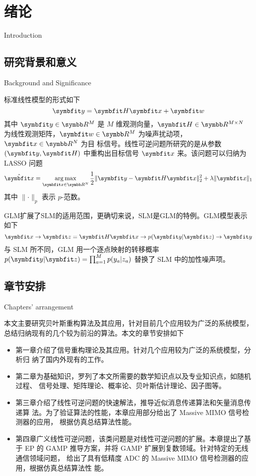 \documentclass[type=master]{../gdutthesis}
\newcommand{\mbb}{\symbb}
\newcommand{\mbfit}{\symbfit}
\DeclareMathOperator*{\argmax}{arg\,max}
\begin{document}
\gduttableofcontents

\mainmatter

\chapter{绪论}{Introduction}
\section{研究背景和意义}{Background and Significance}

标准线性模型的形式如下
\begin{equation}
  \mbfit y = \mbfit H \mbfit x + \mbfit w
\end{equation}
其中 $\mbfit y \in \mbb R^M$ 是 $M$ 维观测向量，$\mbfit H \in \mbb R^{M \times N}$
为线性观测矩阵，$\mbfit w \in \mbb R^M$ 为噪声扰动项，$\mbfit x \in \mbb R^N$ 为目
标信号。线性可逆问题所研究的是从参数 $(\mbfit y, \mbfit H)$ 中重构出目标信号 $\mbfit x$ 来。该问题可以归纳为 LASSO 问题
\begin{equation}
  \hat{ \mbfit x } = \argmax_{ \mbfit x \in \mbb R^N } \frac{1}{2} \lVert \mbfit y - \mbfit H \mbfit x \rVert_2^2 + \lambda \lVert \mbfit x \rVert_1
\end{equation}
其中 $\lVert · \rVert_p$ 表示 $p$-范数。

GLM扩展了SLM的适用范围，更确切来说，SLM是GLM的特例。GLM模型表示如下
\begin{equation}
  \mbfit x \to \mbfit z = \mbfit H \mbfit x \to p( \mbfit y | \mbfit z ) \to \mbfit y
\end{equation}
与 SLM 所不同，GLM 用一个逐点映射的转移概率
$p( \mbfit y | \mbfit z ) = \prod_{a=1}^M p( y_a | z_a )$
替换了 SLM 中的加性噪声项。

\section{章节安排}{Chapters' arrangement}

本文主要研究贝叶斯重构算法及其应用，针对目前几个应用较为广泛的系统模型，
总结归纳现有的几个较为前沿的算法。本文的章节安排如下

\begin{itemize}
  \item 第一章介绍了信号重构理论及其应用。针对几个应用较为广泛的系统模型，分析归
  纳了国内外现有的工作。
  \item 第二章为基础知识，罗列了本文所需要的数学知识点以及专业知识点，如随机过程、
  信号处理、矩阵理论、概率论、贝叶斯估计理论、因子图等。
  \item 第三章介绍了线性可逆问题的快速解法，推导近似消息传递算法和矢量消息传递算
  法。为了验证算法的性能，本章应用部分给出了 Massive MIMO 信号检测器的应用，
  根据仿真总结算法性能。
  \item 第四章广义线性可逆问题，该类问题是对线性可逆问题的扩展。本章提出了基于 
  EP 的 GAMP 推导方案，并将 GAMP 扩展到复数领域。针对特定的无线通信领域问题，
  给出了具有低精度 ADC 的 Massive MIMO 信号检测器的应用，根据仿真总结算法性
  能。
\end{itemize}
\end{document}
